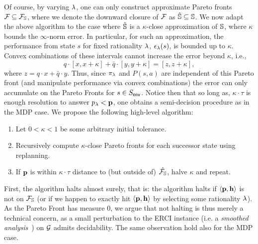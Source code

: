 Of course, by varying $\lambda$, one can only construct approximate
Pareto fronts $\mathcal{F}_{} \subseteq \mathcal{F}_{\mathbb{S}}$, where we denote the downward closure of $\mathcal{F}_{}$ as $\hat{\mathbb{S}} \subseteq \mathbb{S}$.
    We now
adapt the above algorithm to the case where $\hat{\mathbb{S}}$ is a $\kappa$-close approximation of $\mathbb{S}$, where $\kappa$ bounds the $\infty$-norm
error. In particular, for such an approximation, the performance from state  $s$ for fixed rationality $\lambda$, $\epsilon_\lambda(s)$, is bounded up to  $\kappa$. 
Convex combinations of these intervals cannot
increase the error beyond $\kappa$, i.e.,
\begin{equation}
  q\cdot[x, x + \kappa] + \bar{q}\cdot[y, y + \kappa] = [z, z + \kappa],
\end{equation}
where $z = q\cdot x + \bar{q}\cdot y$. Thus, since $\pi_\lambda$ and
$P(s, a)$ are independent of this Pareto front (and manipulate
performance via convex combinations) the error can only accumulate on
the Pareto Fronts for $s \in S_{\mathsf{env}}$. Notice then that so long as,
$\kappa\cdot\tau$ is enough resolution to answer $p_\lambda <
\mathbf{p}$, one obtains a semi-decision procedure as in the MDP
case.
We propose the following high-level algorithm:
\begin{mdframed}
\begin{enumerate}
\item Let $0 < \kappa < 1$ be some arbitrary initial tolerance.
\item Recursively compute $\kappa$-close Pareto fronts for each successor state using replanning.
\item If $\mathbf{p}$ is within $\kappa\cdot \tau$ distance to (but outside of) $\hat{\mathcal{F}_{\mathbb{S}}}$,
  halve $\kappa$ and repeat.
\end{enumerate}  
\end{mdframed}
First, the algorithm halts almost surely, that is: 
the algorithm halts if $\langle \mathbf{p}, \mathbf{h} \rangle$ is
not on $\mathcal{F}_{\mathbb{S}}$ (or if we happen to exactly hit $\langle \mathbf{p}, \mathbf{h}\rangle$ by selecting some rationality $\lambda$).
As the Pareto Front has
measure 0, we argue that not halting is thus merely a technical concern, as a
small perturbation to the ERCI instance (i.e. a \emph{smoothed
analysis}~\cite{SmoothedAnalysis}) on $\mathcal{G}$ admits decidability. 
The same observation hold also for the MDP case.

